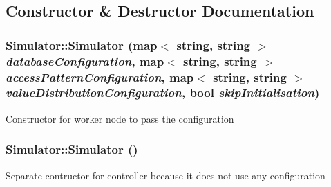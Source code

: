 \subsection{Constructor \& Destructor Documentation}
\hypertarget{classSimulator_a5c46ca7ea1fd4a67fc43d931fadbb347}{
\subsubsection[{Simulator}]{\setlength{\rightskip}{0pt plus 5cm}Simulator::Simulator (map$<$ string, string $>$ {\em databaseConfiguration}, \/  map$<$ string, string $>$ {\em accessPatternConfiguration}, \/  map$<$ string, string $>$ {\em valueDistributionConfiguration}, \/  bool {\em skipInitialisation})}}
\label{classSimulator_a5c46ca7ea1fd4a67fc43d931fadbb347}
Constructor for worker node to pass the configuration \hypertarget{classSimulator_a031573bfcfe2e0f5c9539bcc1c7fc5d9}{
\subsubsection[{Simulator}]{\setlength{\rightskip}{0pt plus 5cm}Simulator::Simulator ()}}
\label{classSimulator_a031573bfcfe2e0f5c9539bcc1c7fc5d9}
Separate contructor for controller because it does not use any configuration 

